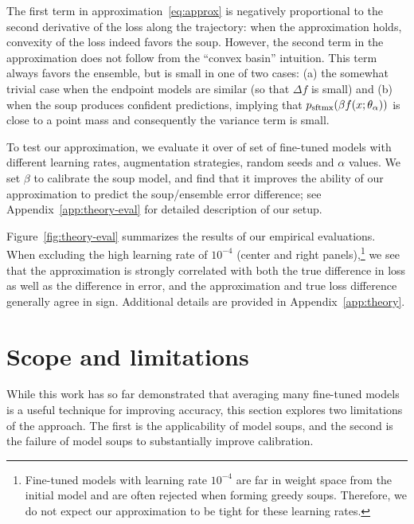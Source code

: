 \documentclass[nohyperref]{article}
\theoremstyle{plain}
\theoremstyle{definition}
\theoremstyle{remark}
\begin{document}
        The first term in approximation~\eqref{eq:approx} is negatively proportional to the second derivative of the loss along the trajectory: when the approximation holds, convexity of the loss indeed favors the soup. However, the second term in the approximation does not follow from the ``convex basin'' intuition. This term always favors the ensemble, but is small in one of two cases: (a) the somewhat trivial case when the endpoint models are similar (so that $\Delta f$ is small) and (b) when the soup produces confident predictions, implying that $p_\mathrm{sftmx}(\beta f(x;\theta_\alpha))$ is close to a point mass and consequently the variance term is small.
        
        To test our approximation, we evaluate it over of set of fine-tuned models 
        with different learning rates, augmentation strategies, random seeds and $\alpha$ values. We set $\beta$ to calibrate the soup model, and find that it improves the ability of our approximation to predict the soup/ensemble error difference; see Appendix~\ref{app:theory-eval} for detailed description of our  setup.
        
        Figure~\ref{fig:theory-eval} summarizes the results of our empirical evaluations. When excluding the high learning rate of $10^{-4}$ (center and right panels),\footnote{Fine-tuned models with learning rate $10^{-4}$ are far in weight space from the initial model and are often rejected when forming greedy soups. %
        Therefore, we do not expect our approximation to be tight for these learning rates.} we see that the approximation is strongly correlated with both the true difference in loss as well as the difference in error, and the approximation and true loss difference generally agree in sign.
        Additional details are provided in Appendix~\ref{app:theory}.
        
        
        
        
        
        
        \section{Scope and limitations}\label{sec:lim}
        
        While this work has so far demonstrated that
        averaging many fine-tuned models is a useful
        technique for improving accuracy,
        this section explores two limitations of the approach.
        The first is the applicability of model soups,
        and the second is the failure of model soups
        to substantially improve calibration.
        
\end{document}
